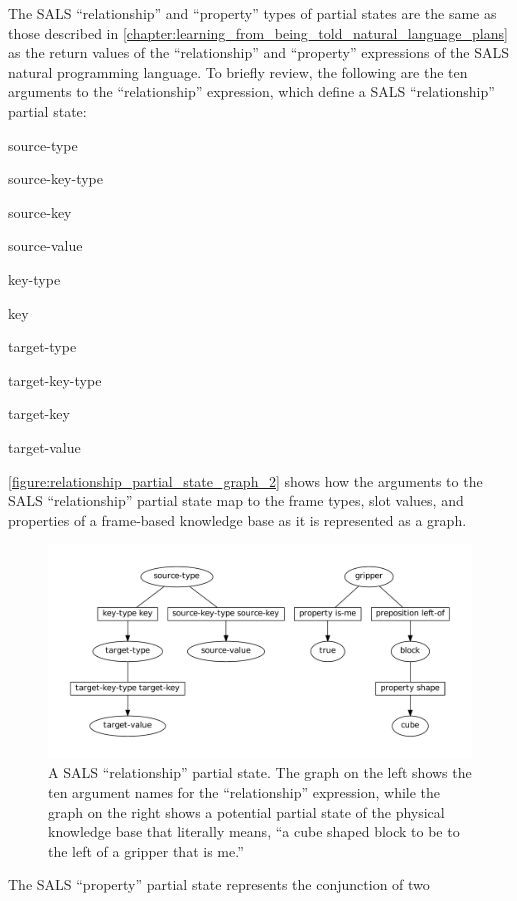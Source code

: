 The SALS ``relationship'' and ``property'' types of partial states are
the same as those described in
{\mbox{\autoref{chapter:learning_from_being_told_natural_language_plans}}}
as the return values of the ``relationship'' and ``property''
expressions of the SALS natural programming language.  To briefly
review, the following are the ten arguments to the ``relationship''
expression, which define a SALS ``relationship'' partial state:
\begin{packed_enumerate}
\item{source-type}
\item{source-key-type}
\item{source-key}
\item{source-value}
\item{key-type}
\item{key}
\item{target-type}
\item{target-key-type}
\item{target-key}
\item{target-value}
\end{packed_enumerate}
{\mbox{\autoref{figure:relationship_partial_state_graph_2}}} shows how
the arguments to the SALS ``relationship'' partial state map to the
frame types, slot values, and properties of a frame-based knowledge
base as it is represented as a graph.
\begin{figure}
\centering
\includegraphics[width=12cm]{gfx/relationship_partial_state_graph}
\caption[A SALS ``relationship'' partial state.]{A SALS
  ``relationship'' partial state.  The graph on the left shows the ten
  argument names for the ``relationship'' expression, while the graph
  on the right shows a potential partial state of the physical
  knowledge base that literally means, ``a cube shaped block to be to
  the left of a gripper that is me.''}
\label{figure:relationship_partial_state_graph_2}
\end{figure}
The SALS ``property'' partial state represents the conjunction of two
